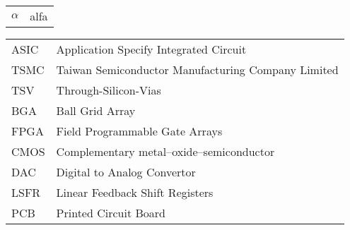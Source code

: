 \begin{tabular}{ l  l }
	
	$\alpha$ 			& alfa 				\\
	
\end{tabular}

\begin{tabular}{ l  l }
	
	ASIC & Application Specify Integrated Circuit \\
	TSMC & Taiwan Semiconductor Manufacturing Company Limited \\ 
	TSV	 & Through-Silicon-Vias \\
	BGA & Ball Grid Array \\
	FPGA & Field Programmable Gate Arrays \\
	CMOS & Complementary metal–oxide–semiconductor \\
	DAC & Digital to Analog Convertor \\
	LSFR & Linear Feedback Shift Registers \\
	PCB & Printed Circuit Board \\
	
		
\end{tabular}